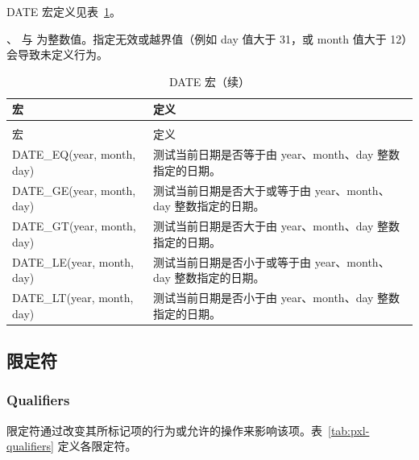 DATE 宏定义见表~\ref{tab:pxl-date-macros}。

\begin{noteBox}
、 与  为整数值。指定无效或越界值（例如 day 值大于 31，或 month 值大于 12）会导致未定义行为。
\end{noteBox}

\begin{longtable}{@{}>{\raggedright\arraybackslash\ttfamily}p{} p{}@{}}
\caption{DATE 宏}\label{tab:pxl-date-macros}\\
\toprule
宏 & 定义 \\
\midrule
\endfirsthead
\caption[]{DATE 宏（续）}\\
\toprule
宏 & 定义 \\
\midrule
\endhead
\bottomrule
\endfoot
DATE\_EQ(year, month, day) & 测试当前日期是否等于由 year、month、day 整数指定的日期。 \\
DATE\_GE(year, month, day) & 测试当前日期是否大于或等于由 year、month、day 整数指定的日期。 \\
DATE\_GT(year, month, day) & 测试当前日期是否大于由 year、month、day 整数指定的日期。 \\
DATE\_LE(year, month, day) & 测试当前日期是否小于或等于由 year、month、day 整数指定的日期。 \\
DATE\_LT(year, month, day) & 测试当前日期是否小于由 year、month、day 整数指定的日期。 \\
\end{longtable}

\subsection{限定符}
\subsubsection*{Qualifiers}

限定符通过改变其所标记项的行为或允许的操作来影响该项。表~\ref{tab:pxl-qualifiers} 定义各限定符。

